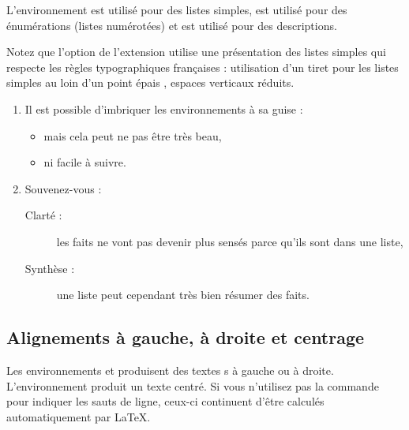 L'environnement  est utilisé pour des listes simples,
 est utilisé pour des énumérations (listes
numérotées) et  est utilisé pour des descriptions.


Notez que l'option  de l'extension  utilise
une présentation des
listes simples qui respecte les règles typographiques françaises : utilisation
d'un tiret pour les listes simples au loin d'un point épais \og \textbullet
\fg, espaces verticaux réduits.

\begin{example}
\begin{enumerate}
\item Il est possible d'imbriquer
les environnements à sa guise :
\begin{itemize}
\item mais cela peut ne pas
  être  très beau,
\item ni facile à suivre.
\end{itemize}
\item Souvenez-vous :
\begin{description}
\item[Clarté :] les faits ne
vont pas devenir plus sensés
parce  qu'ils sont dans une liste,
\item[Synthèse :] une liste peut
cependant très bien
résumer des faits.
\end{description}
\end{enumerate}
\end{example}

\subsection{Alignements à gauche, à droite et centrage}

Les environnements  et  produisent des
textes s à gauche ou à droite. L'environnement 
produit un texte centré. Si vous n'utilisez pas la commande \ci{\bs}
pour indiquer les sauts de ligne, ceux-ci continuent d'être calculés
automatiquement par \LaTeX{}.

